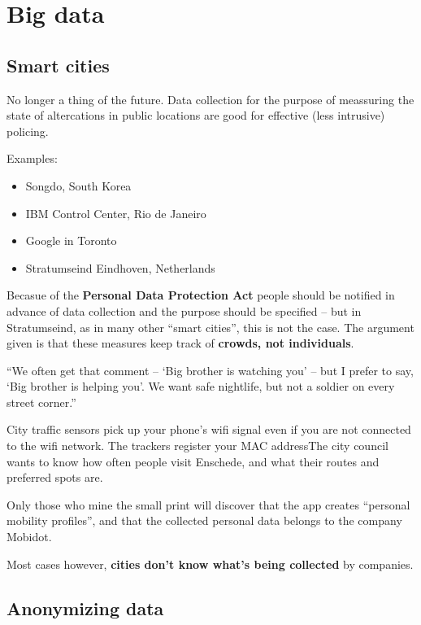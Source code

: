 

\section{Big data} 


\subsection{Smart cities} 

No longer a thing of the future. Data collection for the purpose of meassuring the state of altercations in public locations are good for effective (less intrusive) policing. 

Examples:
\begin{itemize}
	\item Songdo, South Korea
	\item IBM Control Center, Rio de Janeiro
	\item Google in Toronto
	\item Stratumseind Eindhoven, Netherlands
\end{itemize}

Becasue of the \textbf{Personal Data Protection Act} people should be notified in advance of data collection and the purpose should be specified – but in Stratumseind, as in many other “smart cities”, this is not the case.
The argument given is that these measures keep track of \textbf{crowds, not individuals}.

“We often get that comment – ‘Big brother is watching you’ – but I prefer to say, ‘Big brother is helping you’. We want safe nightlife, but not a soldier on every street corner.”

City traffic sensors pick up your phone’s wifi signal even if you are not connected to the wifi network. The trackers register your MAC addressThe city council wants to know how often people visit Enschede, and what their routes and preferred spots are. 

Only those who mine the small print will discover that the app creates “personal mobility profiles”, and that the collected personal data belongs to the company Mobidot.

Most cases however, \textbf{cities don't know what's being collected} by companies.


\subsection{Anonymizing data}

